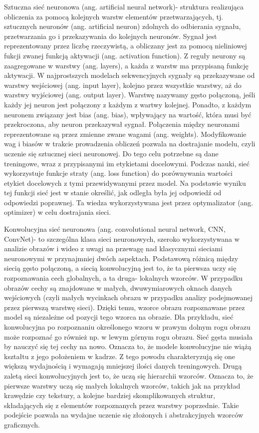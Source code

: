 Sztuczna sieć neuronowa (ang. artificial neural network)- struktura realizująca obliczenia za pomocą kolejnych warstw elementów przetwarzających, tj. sztucznych neuronów (ang. artificial neuron) zdolnych do odbierania sygnału, przetwarzania go i przekazywania do kolejnych neuronów. Sygnał jest reprezentowany przez liczbę rzeczywistą, a obliczany jest za pomocą nieliniowej fukcji zwanej funkcją aktywacji (ang. activation function). Z reguły neurony są zaagregowane w warstwy (ang. layers), a każda z warstw ma przypisaną funkcję aktywacji. W najprostszych modelach sekwencyjnych sygnały są przekazywane od warstwy wejściowej (ang. input layer), kolejno przez wszystkie warstwy, aż do warstwy wyjściowej (ang. output layer). Warstwę nazywamy gęsto połączoną, jeśli każdy jej neuron jest połączony z każdym z wartwy kolejnej. Ponadto, z każdym neuronem związany jest bias (ang. bias), wpływający na wartość, która musi być przekroczona, aby neuron przekazywał sygnał. Połączenia między neuronami reprezentowane są przez zmienne zwane wagami (ang. weights). Modyfikowanie wag i biasów w trakcie prowadzenia obliczeń pozwala na dostrajanie modelu, czyli uczenie się sztucznej sieci neuronowej. Do tego celu potrzebne są dane treningowe, wraz z przypisanymi im etykietami docelowymi. Podczas nauki, sieć wykorzystuje funkcje straty (ang. loss function) do porównywania wartości etykiet docelowych z tymi przewidywanymi przez model. Na podstawie wyniku tej funkcji sieć jest w stanie określić, jak odległa była jej odpowiedź od odpowiedzi poprawnej. Ta wiedza wykorzystywana jest przez optymalizator (ang. optimizer) w celu dostrajania sieci.

Konwolucyjna sieć neuronowa (ang. convolutional neural network, CNN, ConvNet)- to szczególna klasa sieci neuronowych, szeroko wykorzystywana w analizie obrazów i wideo z uwagi na przewagę nad klasycznymi sieciami neuronowymi w przynajmniej dwóch aspektach. Podstawową różnicą między siecią gęsto połączoną, a siecią konwolucyjną jest to, że ta pierwsza uczy się rozpoznawania cech globalnych, a ta druga- lokalnych wzorców. W przypadku obrazów cechy są znajdowane w małych, dwuwymiarowych oknach danych wejściowych (czyli małych wycinkach obrazu w przypadku analizy podejmowanej przez pierwszą warstwę sieci). Dzięki temu, wzorce obrazu rozpoznawane przez model są niezależne od pozycji tego wzorca na obrazie. Dla przykładu, sieć konwolucyjna po rozpoznaniu określonego wzoru w prawym dolnym rogu obrazu może rozpoznać go również np. w lewym górnym rogu obrazu. Sieć gęsta musiała by nauczyć się tej cechy na nowo. Oznacza to, że modele konwolucyjne nie wiążą kształtu z jego położeniem w kadrze. Z tego powodu charakteryzują się one większą wydajnością i wymagają mniejszej ilości danych treningowych. Drugą zaletą sieci konwolucyjnych jest to, że uczą się hierarchii wzorców. Oznacza to, że pierwsze warstwy uczą się małych lokalnych wzorców, takich jak na przykład krawędzie czy tekstury, a kolejne bardziej skomplikowanych struktur, składających się z elementów rozpoznanych przez warstwy poprzednie. Takie podejście pozwala na wydajne uczenie się złożonych i abstrakcyjnych wzorców graficznych.


